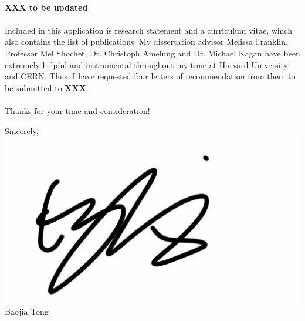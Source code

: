 \documentclass[letterpaper,11pt,oneside]{article}
\begin{document}
\paragraph{} 
\textbf{XXX to be updated }

\paragraph{}
Included in this application is research statement and a curriculum vitae, which also contains the list of publications. My dissertation advisor Melissa Franklin, Professor Mel Shochet, Dr. Christoph Amelung and Dr. Michael Kagan have been extremely helpful and instrumental throughout my time at Harvard University and CERN. Thus, I have requested four letters of recommendation from them to be submitted to \textbf{XXX}.

\paragraph{}
Thanks for your time and consideration!

\begin{flushright}
Sincerely, \\
\vspace{1em} 
\includegraphics[scale=0.1]{Signature} \\ %
\vspace{1em} 
Baojia Tong \\
\end{flushright}
\end{document}
